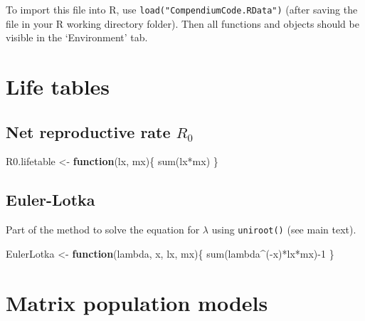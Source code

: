\documentclass[
]{book}
\newenvironment{Shaded}{\begin{snugshade}}{\end{snugshade}}
\newcommand{\ControlFlowTok}[1]{\textcolor[rgb]{0.13,0.29,0.53}{\textbf{#1}}}
\newcommand{\DecValTok}[1]{\textcolor[rgb]{0.00,0.00,0.81}{#1}}
\newcommand{\FunctionTok}[1]{\textcolor[rgb]{0.00,0.00,0.00}{#1}}
\newcommand{\NormalTok}[1]{#1}
\newcommand{\OtherTok}[1]{\textcolor[rgb]{0.56,0.35,0.01}{#1}}
\newcommand{\SpecialCharTok}[1]{\textcolor[rgb]{0.00,0.00,0.00}{#1}}
\begin{document}
To import this file into R, use \texttt{load("CompendiumCode.RData")} (after saving the file in your R working directory folder). Then all functions and objects should be visible in the `Environment' tab.

\hypertarget{life-tables}{%
\section{Life tables}\label{life-tables}}

\hypertarget{net-reproductive-rate-r_0}{%
\subsection{\texorpdfstring{Net reproductive rate \(R_0\)}{Net reproductive rate R\_0}}\label{net-reproductive-rate-r_0}}

\begin{Shaded}
\begin{Highlighting}[]
\NormalTok{R0.lifetable }\OtherTok{\textless{}{-}} \ControlFlowTok{function}\NormalTok{(lx, mx)\{}
  \FunctionTok{sum}\NormalTok{(lx}\SpecialCharTok{*}\NormalTok{mx) }
\NormalTok{\}}
\end{Highlighting}
\end{Shaded}

\hypertarget{euler-lotka}{%
\subsection{Euler-Lotka}\label{euler-lotka}}

Part of the method to solve the equation for \(\lambda\) using \texttt{uniroot()} (see main text).

\begin{Shaded}
\begin{Highlighting}[]
\NormalTok{EulerLotka }\OtherTok{\textless{}{-}} \ControlFlowTok{function}\NormalTok{(lambda, x, lx, mx)\{}
  \FunctionTok{sum}\NormalTok{(lambda}\SpecialCharTok{\^{}}\NormalTok{(}\SpecialCharTok{{-}}\NormalTok{x)}\SpecialCharTok{*}\NormalTok{lx}\SpecialCharTok{*}\NormalTok{mx)}\SpecialCharTok{{-}}\DecValTok{1}
\NormalTok{\}}
\end{Highlighting}
\end{Shaded}

\hypertarget{matrix-population-models}{%
\section{Matrix population models}\label{matrix-population-models}}
\end{document}
